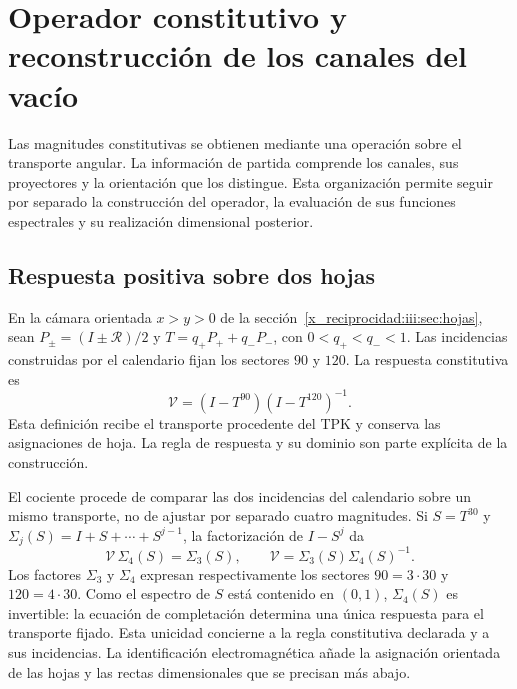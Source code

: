 

\chapter{Operador constitutivo y reconstrucción de los canales del vacío}
\label{x_reciprocidad:iii:sec:constitutiva}

Las magnitudes constitutivas se obtienen mediante una operación sobre el
transporte angular. La información de partida comprende los canales, sus
proyectores y la orientación que los distingue. Esta organización permite
seguir por separado la construcción del operador, la evaluación de sus
funciones espectrales y su realización dimensional posterior.

\section{Respuesta positiva sobre dos hojas}

En la cámara orientada $x>y>0$ de la sección~\ref{x_reciprocidad:iii:sec:hojas}, sean
$P_\pm=(I\pm\mathcal R)/2$ y
$T=q_+P_++q_-P_-$, con $0<q_+<q_-<1$. Las incidencias construidas por el
calendario fijan los sectores $90$ y $120$. La respuesta constitutiva es
\begin{equation}
 \mathcal V=(I-T^{90})(I-T^{120})^{-1}.
 \label{x_reciprocidad:iii:eq:vacuum-op}
\end{equation}
Esta definición recibe el transporte procedente del TPK y conserva las
asignaciones de hoja. La regla de respuesta y su dominio son parte explícita
de la construcción.

El cociente procede de comparar las dos incidencias del calendario sobre
un mismo transporte, no de ajustar por separado cuatro magnitudes. Si
$S=T^{30}$ y $\Sigma_j(S)=I+S+\cdots+S^{j-1}$, la factorización de
$I-S^j$ da
\begin{equation}
 \mathcal V\,\Sigma_4(S)=\Sigma_3(S),\qquad
 \mathcal V=\Sigma_3(S)\Sigma_4(S)^{-1}.
 \label{x_reciprocidad:iii:eq:completion-response}
\end{equation}
Los factores $\Sigma_3$ y $\Sigma_4$ expresan respectivamente los
sectores $90=3\cdot30$ y $120=4\cdot30$. Como el espectro de $S$ está
contenido en $(0,1)$, $\Sigma_4(S)$ es invertible: la ecuación de
completación determina una única respuesta para el transporte fijado.
Esta unicidad concierne a la regla constitutiva declarada y a sus
incidencias. La identificación electromagnética añade la asignación
orientada de las hojas y las rectas dimensionales que se precisan más
abajo.

